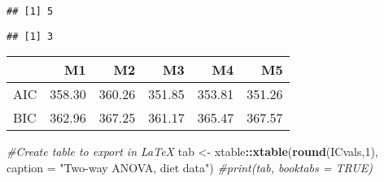 \documentclass[]{book}
\newenvironment{Shaded}{\begin{snugshade}}{\end{snugshade}}
\newcommand{\CommentTok}[1]{\textcolor[rgb]{0.56,0.35,0.01}{\textit{#1}}}
\newcommand{\DataTypeTok}[1]{\textcolor[rgb]{0.13,0.29,0.53}{#1}}
\newcommand{\DecValTok}[1]{\textcolor[rgb]{0.00,0.00,0.81}{#1}}
\newcommand{\KeywordTok}[1]{\textcolor[rgb]{0.13,0.29,0.53}{\textbf{#1}}}
\newcommand{\NormalTok}[1]{#1}
\newcommand{\OperatorTok}[1]{\textcolor[rgb]{0.81,0.36,0.00}{\textbf{#1}}}
\newcommand{\StringTok}[1]{\textcolor[rgb]{0.31,0.60,0.02}{#1}}
\theoremstyle{definition}
\theoremstyle{definition}
\theoremstyle{definition}
\theoremstyle{remark}
\begin{document}
\begin{verbatim}
## [1] 5
\end{verbatim}

\begin{Shaded}
\end{Shaded}

\begin{verbatim}
## [1] 3
\end{verbatim}

\begin{Shaded}
\end{Shaded}

\begin{tabular}{l|r|r|r|r|r}
\hline
  & M1 & M2 & M3 & M4 & M5\\
\hline
AIC & 358.30 & 360.26 & 351.85 & 353.81 & 351.26\\
\hline
BIC & 362.96 & 367.25 & 361.17 & 365.47 & 367.57\\
\hline
\end{tabular}

\begin{Shaded}
\begin{Highlighting}[]
\CommentTok{#Create table to export in LaTeX}
\NormalTok{tab <-}\StringTok{ }\NormalTok{xtable}\OperatorTok{::}\KeywordTok{xtable}\NormalTok{(}\KeywordTok{round}\NormalTok{(ICvals,}\DecValTok{1}\NormalTok{), }\DataTypeTok{caption =} \StringTok{"Two-way ANOVA, diet data"}\NormalTok{)}
\CommentTok{#print(tab, booktabs = TRUE)}
\end{Highlighting}
\end{Shaded}
\end{document}
